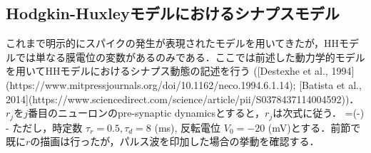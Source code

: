 \subsection{Hodgkin-Huxleyモデルにおけるシナプスモデル}
これまで明示的にスパイクの発生が表現されたモデルを用いてきたが，HHモデルでは単なる膜電位の変数があるのみである．ここでは前述した動力学的モデルを用いてHHモデルにおけるシナプス動態の記述を行う ([Destexhe et al., 1994](https://www.mitpressjournals.org/doi/10.1162/neco.1994.6.1.14); [Batista et al., 2014](https://www.sciencedirect.com/science/article/pii/S0378437114004592))．
$r_{j}$を$j$番目のニューロンのpre-synaptic dynamicsとすると，$r_{j}$は次式に従う．
=\left(-\right) -
ただし，時定数 $\tau_r=0.5, \tau_d = 8$ (ms), 反転電位 $V_0 = -20$ (mV)とする．前節で既に$r$の描画は行ったが，パルス波を印加した場合の挙動を確認する．
